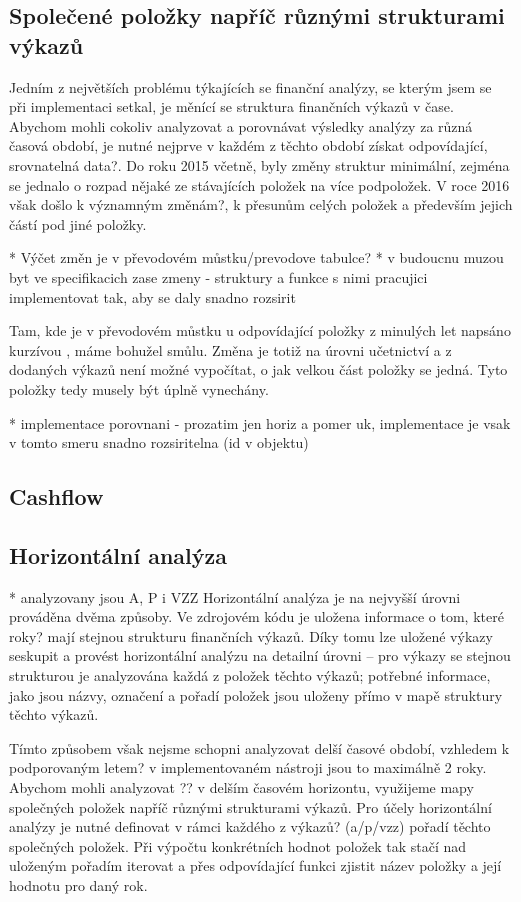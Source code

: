 \subsection{Společené položky napříč různými strukturami výkazů}
Jedním z největších problému týkajících se finanční analýzy, se kterým jsem se při implementaci setkal, je měnící se struktura finančních výkazů v čase. Abychom mohli cokoliv analyzovat a porovnávat výsledky analýzy za různá časová období, je nutné nejprve v každém z těchto období získat odpovídající, srovnatelná data?. Do roku 2015 včetně, byly změny struktur minimální, zejména se jednalo o rozpad nějaké ze stávajících položek na více podpoložek. V roce 2016 však došlo k významným změnám?, k přesunům celých položek a především jejich částí pod jiné položky.

* Výčet změn je v převodovém můstku/prevodove tabulce? 
* v budoucnu muzou byt ve specifikacich zase zmeny - struktury a funkce s nimi pracujici implementovat tak, aby se daly snadno rozsirit

Tam, kde je v převodovém můstku u odpovídající položky z minulých let napsáno kurzívou , máme bohužel smůlu. Změna je totiž na úrovni učetnictví a z dodaných výkazů není možné vypočítat, o jak velkou část položky se jedná. Tyto položky tedy musely být úplně vynechány. 

* implementace porovnani - prozatim jen horiz a pomer uk, implementace je vsak v tomto smeru snadno rozsiritelna (id v objektu)

\subsection{Cashflow}


\subsection{Horizontální analýza}
* analyzovany jsou A, P i VZZ
Horizontální analýza je na nejvyšší úrovni prováděna dvěma způsoby. Ve zdrojovém kódu je uložena informace o tom, které roky? mají stejnou strukturu finančních výkazů. Díky tomu lze uložené výkazy seskupit a provést horizontální analýzu na detailní úrovni -- pro výkazy se stejnou strukturou je analyzována každá z položek těchto výkazů; potřebné informace, jako jsou názvy, označení a pořadí položek jsou uloženy přímo v mapě struktury těchto výkazů.

Tímto způsobem však nejsme schopni analyzovat delší časové období, vzhledem k podporovaným letem? v implementovaném nástroji jsou to maximálně 2 roky. Abychom mohli analyzovat ?? v delším časovém horizontu, využijeme mapy společných položek napříč různými strukturami výkazů. Pro účely horizontální analýzy je nutné definovat v rámci každého z výkazů? (a/p/vzz) pořadí těchto společných položek. Při výpočtu konkrétních hodnot položek tak stačí nad uloženým pořadím iterovat a přes odpovídající funkci zjistit název položky a její hodnotu pro daný rok.

